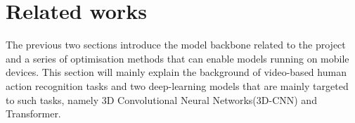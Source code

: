 \section{Related works}
\label{sec:Related works}
The previous two sections introduce the model backbone related to the project and a series of optimisation methods that can enable models running on mobile devices.
This section will mainly explain the background of video-based human action recognition tasks and two deep-learning models that are mainly targeted to such tasks, namely 3D Convolutional Neural Networks(3D-CNN) and Transformer.



